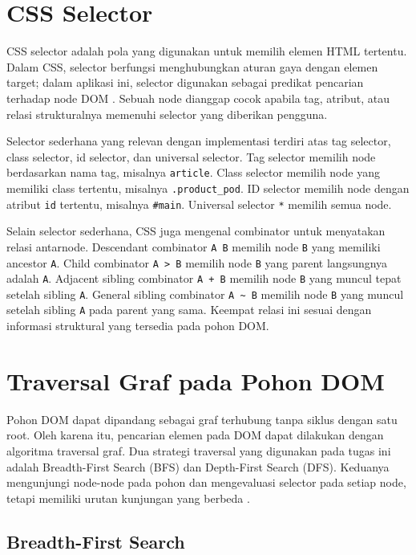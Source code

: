 \section{CSS Selector}

CSS selector adalah pola yang digunakan untuk memilih elemen HTML tertentu. Dalam CSS, selector berfungsi menghubungkan aturan gaya dengan elemen target; dalam aplikasi ini, selector digunakan sebagai predikat pencarian terhadap node DOM \cite{w3cselectors}. Sebuah node dianggap cocok apabila tag, atribut, atau relasi strukturalnya memenuhi selector yang diberikan pengguna.

Selector sederhana yang relevan dengan implementasi terdiri atas tag selector, class selector, id selector, dan universal selector. Tag selector memilih node berdasarkan nama tag, misalnya \texttt{article}. Class selector memilih node yang memiliki class tertentu, misalnya \texttt{.product\_pod}. ID selector memilih node dengan atribut \texttt{id} tertentu, misalnya \texttt{\#main}. Universal selector \texttt{*} memilih semua node.

Selain selector sederhana, CSS juga mengenal combinator untuk menyatakan relasi antarnode. Descendant combinator \texttt{A B} memilih node \texttt{B} yang memiliki ancestor \texttt{A}. Child combinator \texttt{A > B} memilih node \texttt{B} yang parent langsungnya adalah \texttt{A}. Adjacent sibling combinator \texttt{A + B} memilih node \texttt{B} yang muncul tepat setelah sibling \texttt{A}. General sibling combinator \texttt{A \textasciitilde{} B} memilih node \texttt{B} yang muncul setelah sibling \texttt{A} pada parent yang sama. Keempat relasi ini sesuai dengan informasi struktural yang tersedia pada pohon DOM.

\section{Traversal Graf pada Pohon DOM}

Pohon DOM dapat dipandang sebagai graf terhubung tanpa siklus dengan satu root. Oleh karena itu, pencarian elemen pada DOM dapat dilakukan dengan algoritma traversal graf. Dua strategi traversal yang digunakan pada tugas ini adalah Breadth-First Search (BFS) dan Depth-First Search (DFS). Keduanya mengunjungi node-node pada pohon dan mengevaluasi selector pada setiap node, tetapi memiliki urutan kunjungan yang berbeda \cite{cormen2009introduction}.

\subsection{Breadth-First Search}

